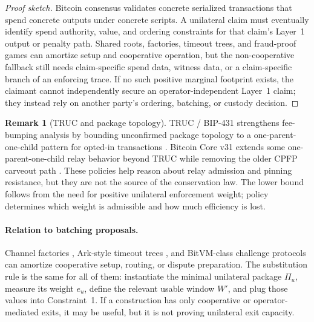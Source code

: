 \documentclass{article}
\theoremstyle{definition}
\newtheorem{remark}{Remark}
\begin{document}
\begin{proof}[Proof sketch]
Bitcoin consensus validates concrete serialized transactions that spend concrete outputs under concrete scripts. A unilateral claim must eventually identify spend authority, value, and ordering constraints for that claim's Layer~1 output or penalty path. Shared roots, factories, timeout trees, and fraud-proof games can amortize setup and cooperative operation, but the non-cooperative fallback still needs claim-specific spend data, witness data, or a claim-specific branch of an enforcing trace. If no such positive marginal footprint exists, the claimant cannot independently secure an operator-independent Layer~1 claim; they instead rely on another party's ordering, batching, or custody decision.
\end{proof}

\begin{remark}[TRUC and package topology]
TRUC / BIP-431 strengthens fee-bumping analysis by bounding unconfirmed package topology to a one-parent-one-child pattern for opted-in transactions \cite{bip431,core28}. Bitcoin Core v31 extends some one-parent-one-child relay behavior beyond TRUC while removing the older CPFP carveout path \cite{core31}. These policies help reason about relay admission and pinning resistance, but they are not the source of the conservation law. The lower bound follows from the need for positive unilateral enforcement weight; policy determines which weight is admissible and how much efficiency is lost.
\end{remark}

\paragraph{Relation to batching proposals.}
Channel factories \cite{factory}, Ark-style timeout trees \cite{ark}, and BitVM-class challenge protocols \cite{bitvm} can amortize cooperative setup, routing, or dispute preparation. The substitution rule is the same for all of them: instantiate the minimal unilateral package $\Pi_u$, measure its weight $e_u$, define the relevant usable window $W'$, and plug those values into Constraint~1. If a construction has only cooperative or operator-mediated exits, it may be useful, but it is not proving unilateral exit capacity.
\end{document}
